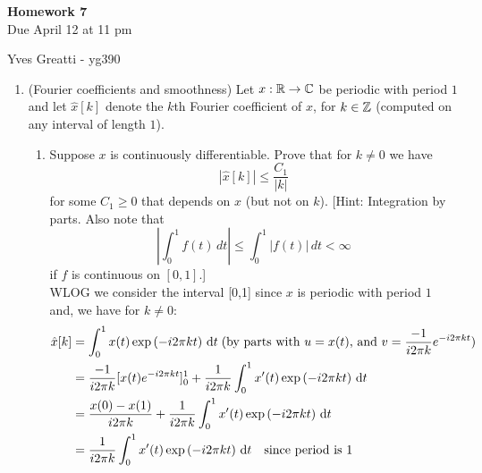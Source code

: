 \documentclass[12pt,twoside]{article}
\begin{document}
\begin{center}
{\large{\textbf{Homework 7}} } \vspace{0.2cm}\\
Due April 12 at 11 pm
\end{center}
Yves Greatti - yg390\\

\begin{enumerate}

\item (Fourier coefficients and smoothness) Let $x:\mathbb{R}\to\mathbb{C}$ be
  periodic with period $1$
  and let $\hat{x}[k]$ denote the $k$th Fourier coefficient of $x$,
  for $k\in\mathbb{Z}$ (computed on any interval of length $1$).
  \begin{enumerate}
  \item Suppose $x$ is continuously differentiable. Prove that for
    $k\neq 0$ we have
    $$|\hat{x}[k]| \leq \frac{C_1}{|k|}$$
    for some $C_1\geq0$ that depends on $x$ (but not on $k$). [Hint:
      Integration by parts.  Also note that
      $$\left|\int_0^1 f(t)\,dt\right| \leq \int_0^1 |f(t)|\,dt<\infty$$
    if $f$ is continuous on $[0,1]$.]\\
    
   WLOG we consider the interval [0,1] since  $x$ is periodic with period $1$ and, we have for $k \neq 0$:
    \begin{align*}
	    \hat{x}[k] 	&= \int_0^1 x(t) \exp \left( - i2 \pi k t \right)  \, \text{d}t  \; (\text{by parts with } u=x(t) \text{, and } v=\frac{-1}{i 2 \pi k} e^{-i2 \pi kt})\\	
	    			&= \frac{-1}{i 2 \pi k} [x(t) e^{-i2 \pi kt}]_0^1 + \frac{1}{i 2 \pi k} \int_0^1 x'(t) \exp \left( - i2 \pi k t \right)  \, \text{d}t\\  	
				&=  \frac{x(0) - x(1)} {i 2 \pi k} + \frac{1}{i 2 \pi k} \int_0^1 x'(t) \exp \left( - i2 \pi k t \right)  \, \text{d}t\\
				&=  \frac{1}{i 2 \pi k} \int_0^1 x'(t) \exp \left( - i2 \pi k t \right)  \, \text{d}t \text{ ~ since period is 1 }\\
    \end{align*}
    

\end{enumerate}
\end{enumerate}
\end{document}
